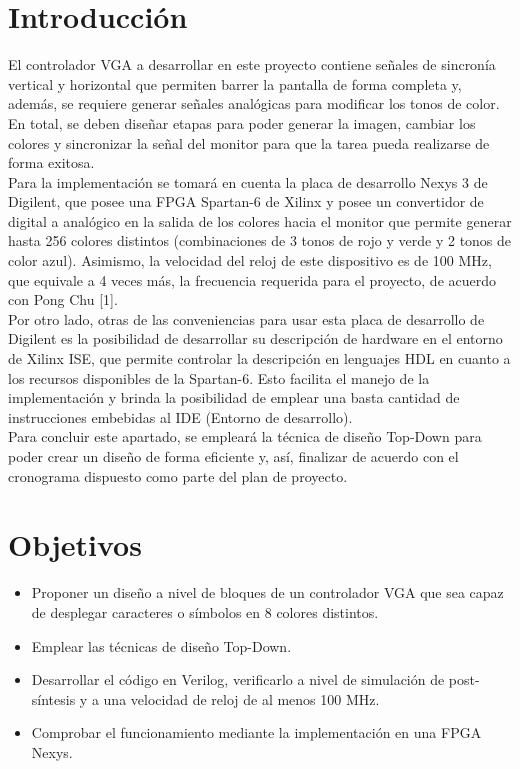 \documentclass[12pt,a4paper]{article}
\begin{document}
\section{Introducción} 
El controlador VGA a desarrollar en este proyecto contiene señales de sincronía vertical y horizontal que permiten barrer la pantalla de forma completa y, además, se requiere generar señales analógicas para modificar los tonos de color. En total, se deben diseñar etapas para poder generar la imagen, cambiar los colores y sincronizar la señal del monitor para que la tarea pueda realizarse de forma exitosa. \\[2ex]
Para la implementación se tomará en cuenta la placa de desarrollo Nexys 3 de Digilent, que posee una FPGA Spartan-6 de Xilinx y posee un convertidor de digital a analógico en la salida de los colores hacia el monitor que permite generar hasta 256 colores distintos (combinaciones de 3 tonos de rojo y verde y 2 tonos de color azul). Asimismo, la velocidad del reloj de este dispositivo es de 100 MHz, que equivale a 4 veces más, la frecuencia requerida para el proyecto, de acuerdo con Pong Chu [1]. \\[2ex]
Por otro lado, otras de las conveniencias para usar esta placa de desarrollo de Digilent es la posibilidad de desarrollar su descripción de hardware en el entorno de Xilinx ISE, que permite controlar la descripción en lenguajes HDL en cuanto a los recursos disponibles de la Spartan-6. Esto facilita el manejo de la implementación y brinda la posibilidad de emplear una basta cantidad de instrucciones embebidas al IDE (Entorno de desarrollo). \\[2ex]
Para concluir este apartado, se empleará la técnica de diseño Top-Down para poder crear un diseño de forma eficiente y, así, finalizar de acuerdo con el cronograma dispuesto como parte del plan de proyecto.

\section{Objetivos}
\begin{itemize}
    \item Proponer un diseño a nivel de bloques de un controlador VGA que sea capaz de desplegar caracteres o símbolos en 8 colores distintos.
    \item Emplear las técnicas de diseño Top-Down.
    \item Desarrollar el código en Verilog, verificarlo a nivel de simulación de post-síntesis y a una velocidad de reloj de al menos 100 MHz.
    \item Comprobar el funcionamiento mediante la implementación en una FPGA Nexys.
\end{itemize}
\end{document}
